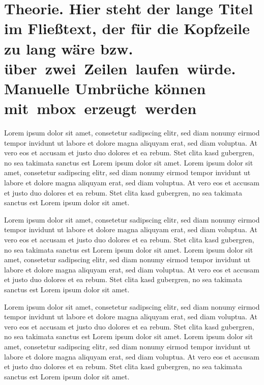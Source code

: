 \chapter[Theorie (hier steht der Kurztitel im Inhaltsverzeichnis und in der Kopfzeile)]{Theorie. Hier steht der lange Titel im Fließtext, der für die Kopfzeile zu lang wäre bzw. \mbox{über zwei Zeilen laufen würde.} Manuelle Umbrüche können \mbox{mit mbox erzeugt werden}}
\label{cha:Theorie}


Lorem ipsum dolor sit amet, consetetur sadipscing elitr, sed diam nonumy eirmod tempor invidunt ut labore et dolore magna aliquyam erat, sed diam voluptua. At vero eos et accusam et justo duo dolores et ea rebum. Stet clita kasd gubergren, no sea takimata sanctus est Lorem ipsum dolor sit amet. Lorem ipsum dolor sit amet, consetetur sadipscing elitr, sed diam nonumy eirmod tempor invidunt ut labore et dolore magna aliquyam erat, sed diam voluptua. At vero eos et accusam et justo duo dolores et ea rebum. Stet clita kasd gubergren, no sea takimata sanctus est Lorem ipsum dolor sit amet.

Lorem ipsum dolor sit amet, consetetur sadipscing elitr, sed diam nonumy eirmod tempor invidunt ut labore et dolore magna aliquyam erat, sed diam voluptua. At vero eos et accusam et justo duo dolores et ea rebum. Stet clita kasd gubergren, no sea takimata sanctus est Lorem ipsum dolor sit amet. Lorem ipsum dolor sit amet, consetetur sadipscing elitr, sed diam nonumy eirmod tempor invidunt ut labore et dolore magna aliquyam erat, sed diam voluptua. At vero eos et accusam et justo duo dolores et ea rebum. Stet clita kasd gubergren, no sea takimata sanctus est Lorem ipsum dolor sit amet.

Lorem ipsum dolor sit amet, consetetur sadipscing elitr, sed diam nonumy eirmod tempor invidunt ut labore et dolore magna aliquyam erat, sed diam voluptua. At vero eos et accusam et justo duo dolores et ea rebum. Stet clita kasd gubergren, no sea takimata sanctus est Lorem ipsum dolor sit amet. Lorem ipsum dolor sit amet, consetetur sadipscing elitr, sed diam nonumy eirmod tempor invidunt ut labore et dolore magna aliquyam erat, sed diam voluptua. At vero eos et accusam et justo duo dolores et ea rebum. Stet clita kasd gubergren, no sea takimata sanctus est Lorem ipsum dolor sit amet.

